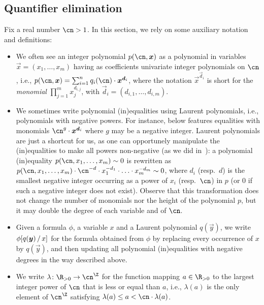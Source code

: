 \subsection{Quantifier elimination}
\label{subsection:quantifier-elimination}
Fix a real number $\cn > 1$. In this section, we rely on some auxiliary notation
and definitions:
\begin{itemize}
  \item We often see an integer polynomial $p(\cn, \vec x)$ as a polynomial in
  variables $\vec x = (x_1,\dots,x_m)$ having as coefficients univariate integer
  polynomials on $\cn$, i.e., ${p(\cn, \vec x) = \sum_{i=1}^n q_i(\cn) \cdot
  \vec{x}^{\vec{d}_i}}$, where the notation $\vec{x}^{\vec{d}_i}$ is short for
  the \emph{monomial} $\prod_{j=1}^m x_j^{d_{i,j}}$, with $\vec{d}_{i} =
  (d_{i,1},\dots,d_{i,m})$.
  \item We sometimes write polynomial (in)equalities using Laurent polynomials,
  i.e., polynomials with negative powers. For instance,  below features equalities with monomials
  $\cn^g \cdot {\vec{x}}^{\vec{d}_i}$ where $g$ may be a negative integer. Laurent polynomials are just a
  shortcut for us, as one can opportunely manipulate the (in)equalities to make
  all powers non-negative (as we did
  in~): a polynomial
  (in)equality $p(\cn,x_1,\dots,x_m) \sim 0$ is rewritten as
  $p(\cn,x_1,\dots,x_m) \cdot \cn^{-d} \cdot x_1^{-d_1} \cdot {\dots} \cdot
  x_m^{-d_m} \sim 0$, where $d_i$ (resp.~$d$) is the smallest negative integer
  occurring as a power of $x_i$ (resp.~$\cn$) in $p$ (or $0$ if such a negative
  integer does not exist). Observe that this transformation does not change the
  number of monomials nor the height of the polynomial $p$, but it may double the
  degree of each variable and of $\cn$.
  \item Given a formula $\phi$, a variable $x$ and a Laurent polynomial
  $q(\vec{y})$, we write $\phi[q(\bm y)\,/\,x]$ for the formula obtained from
  $\phi$ by replacing every occurrence of $x$ by $q(\vec y)$, and then
  updating all polynomial (in)equalities with negative degrees in the way
  described above.
  \item We write $\lambda \colon \R_{> 0} \to \ipow{\cn}$ for the function
  mapping $a \in \R_{> 0}$ to the largest integer power of $\cn$ that is less or
  equal than $a$, i.e., $\lambda(a)$ is the only element of $\ipow{\cn}$
  satisfying $\lambda(a) \leq a < \cn \cdot \lambda(a)$. 
\end{itemize}

